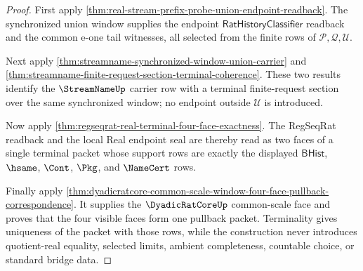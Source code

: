 \begin{proof}
First apply
\autoref{thm:real-stream-prefix-probe-union-endpoint-readback}. The synchronized
union window supplies the endpoint $\mathsf{RatHistoryClassifier}$ readback and
the common e-one tail witnesses, all selected from the finite rows of
$\mathcal P,\mathcal Q,\mathcal U$.

Next apply \autoref{thm:streamname-synchronized-window-union-carrier} and
\autoref{thm:streamname-finite-request-section-terminal-coherence}. These two
results identify the $\StreamNameUp$ carrier row with a terminal finite-request
section over the same synchronized window; no endpoint outside $\mathcal U$ is
introduced.

Now apply \autoref{thm:regseqrat-real-terminal-four-face-exactness}. The
RegSeqRat readback and the local Real endpoint seal are thereby read as two
faces of a single terminal packet whose support rows are exactly the displayed
$\mathsf{BHist}$, $\hsame$, $\Cont$, $\Pkg$, and $\NameCert$ rows.

Finally apply
\autoref{thm:dyadicratcore-common-scale-window-four-face-pullback-correspondence}.
It supplies the $\DyadicRatCoreUp$ common-scale face and proves that the four
visible faces form one pullback packet. Terminality gives uniqueness of the
packet with those rows, while the construction never introduces quotient-real
equality, selected limits, ambient completeness, countable choice, or standard
bridge data.
\end{proof}

